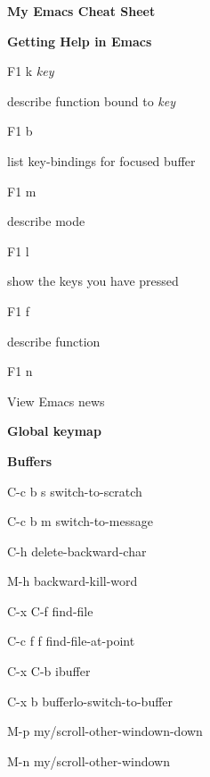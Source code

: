 \documentclass[10pt]{article}
\renewcommand\section[1]{\bigskip\par\textbf{\color{heading}\large#1}\smallskip}
\renewcommand\subsection[1]{\smallskip\par\textbf{\color{heading}#1}}
\newcommand\humanreadable[1]{{\par\color{default}\small\sffamily#1}}
\newcommand\meta[1]{\textlangle\textit{#1}\textrangle}
\begin{document}
\author{Jousimies}
\begin{multicols}{4}

  \setlength{\columnsep}{1cm}
  \begin{center}
    \LARGE\color{heading}\textbf{My Emacs Cheat Sheet}
  \end{center}

  \section{Getting Help in Emacs}
  \begin{keylist}
  \item[F1 k \meta{key}] \humanreadable{describe function bound to \meta{key}}
  \item[F1 b] \humanreadable{list key-bindings for focused buffer}
  \item[F1 m] \humanreadable{describe mode}
  \item[F1 l] \humanreadable{show the keys you have pressed}
  \item[F1 f] \humanreadable{describe function}
  \item[F1 n] \humanreadable{View Emacs news}
  \end{keylist}

  \section{Global keymap}

  \subsection{Buffers}
  \begin{keylist}
  \item[C-c b s] switch-to-scratch
  \item[C-c b m] switch-to-message

  \item[C-h] delete-backward-char
  \item[M-h] backward-kill-word

  \item[C-x C-f] find-file
  \item[C-c f f] find-file-at-point

  \item[C-x C-b] ibuffer
  \item[C-x b] bufferlo-switch-to-buffer

  \item[M-p] my/scroll-other-windown-down
  \item[M-n] my/scroll-other-windown


\end{keylist}
\end{multicols}
\end{document}
